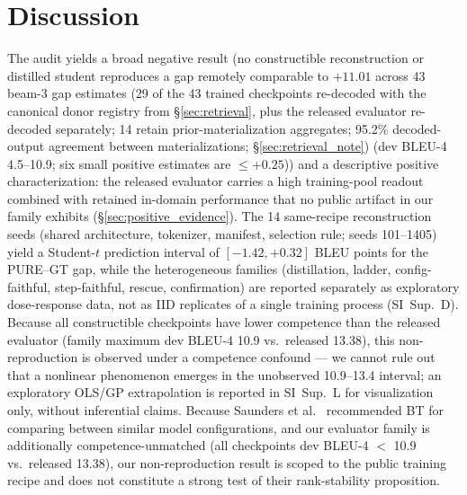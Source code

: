 \documentclass[pdflatex,sn-chicago]{sn-jnl}
\begin{document}
\section{Discussion}
The audit yields a broad negative result (no constructible reconstruction or distilled student reproduces a gap remotely comparable to $+11.01$ across 43 beam-3 gap estimates (29 of the 43 trained checkpoints re-decoded with the canonical donor registry from \S\ref{sec:retrieval}, plus the released evaluator re-decoded separately; 14 retain prior-materialization aggregates; 95.2\% decoded-output agreement between materializations; \S\ref{sec:retrieval_note}) (dev BLEU-4 4.5--10.9; six small positive estimates are $\leq +0.25$)) and a descriptive positive characterization: the released evaluator carries a high training-pool readout combined with retained in-domain performance that no public artifact in our family exhibits (\S\ref{sec:positive_evidence}). The 14 same-recipe reconstruction seeds (shared architecture, tokenizer, manifest, selection rule; seeds 101--1405) yield a Student-$t$ prediction interval of $[-1.42, +0.32]$ BLEU points for the PURE--GT gap, while the heterogeneous families (distillation, ladder, config-faithful, step-faithful, rescue, confirmation) are reported separately as exploratory dose-response data, not as IID replicates of a single training process (SI~Sup.~D). Because all constructible checkpoints have lower competence than the released evaluator (family maximum dev BLEU-4 10.9 vs.\ released 13.38), this non-reproduction is observed under a competence confound --- we cannot rule out that a nonlinear phenomenon emerges in the unobserved 10.9--13.4 interval; an exploratory OLS/GP extrapolation is reported in SI~Sup.~L for visualization only, without inferential claims. Because Saunders et al.~\cite{saunders2021continuous} recommended BT for comparing between similar model configurations, and our evaluator family is additionally competence-unmatched (all checkpoints dev BLEU-4 $<$ 10.9 vs.\ released 13.38), our non-reproduction result is scoped to the public training recipe and does not constitute a strong test of their rank-stability proposition.
\end{document}
